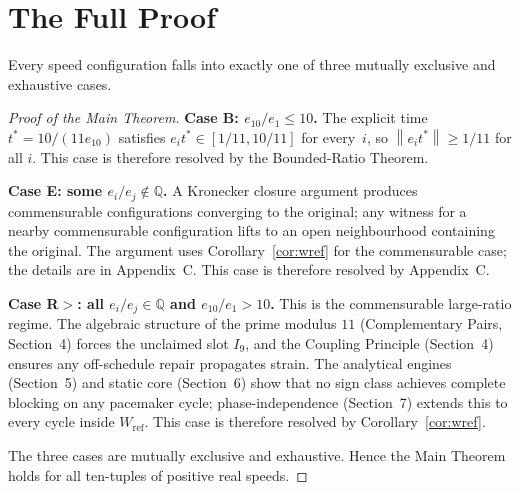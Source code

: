 \documentclass[12pt,a4paper]{amsart}
\theoremstyle{definition}
\theoremstyle{remark}
\newcommand{\Wref}{W_{\mathrm{ref}}}
\newcommand{\norm}[1]{\left\|#1\right\|}
\begin{document}
\section{The Full Proof}

Every speed configuration falls into exactly one of three mutually exclusive and
exhaustive cases.

\begin{proof}[Proof of the Main Theorem]

\medskip\noindent\textbf{Case B: $e_{10}/e_1\le 10$.}
The explicit time $t^*=10/(11e_{10})$ satisfies $e_it^*\in[1/11,10/11]$ for every~$i$,
so $\norm{e_it^*}\ge 1/11$ for all $i$. This case is therefore resolved by the
Bounded-Ratio Theorem.

\medskip\noindent\textbf{Case E: some $e_i/e_j\notin\mathbb{Q}$.}
A Kronecker closure argument produces commensurable configurations converging to the
original; any witness for a nearby commensurable configuration lifts to an open
neighbourhood containing the original. The argument uses Corollary~\ref{cor:wref} for
the commensurable case; the details are in Appendix~C. This case is therefore resolved
by Appendix~C.

\medskip\noindent\textbf{Case R$>$: all $e_i/e_j\in\mathbb{Q}$ and $e_{10}/e_1>10$.}
This is the commensurable large-ratio regime. The algebraic structure of the prime modulus
$11$ (Complementary Pairs, Section~4) forces the unclaimed slot $I_9$, and the Coupling
Principle (Section~4) ensures any off-schedule repair propagates strain. The analytical
engines (Section~5) and static core (Section~6) show that no sign class achieves complete
blocking on any pacemaker cycle; phase-independence (Section~7) extends this to every
cycle inside $\Wref$. This case is therefore resolved by Corollary~\ref{cor:wref}.

\medskip\noindent
The three cases are mutually exclusive and exhaustive. Hence the Main Theorem holds for
all ten-tuples of positive real speeds.
\end{proof}
\end{document}

